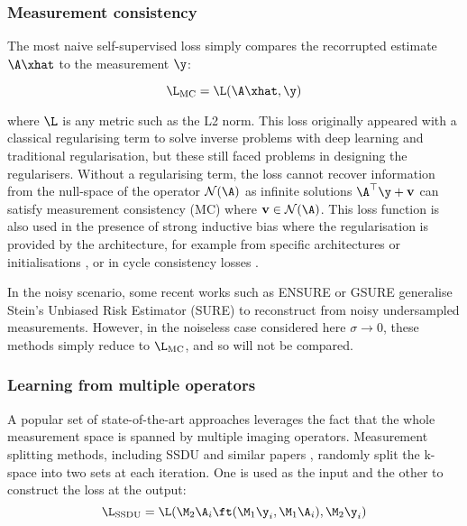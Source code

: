 \subsubsection{Measurement consistency}
The most naive self-supervised loss simply compares the recorrupted estimate $\A\xhat$ to the measurement $\y$:

\begin{equation}
    \L_\text{MC}=\L(\A\xhat,\y)
    \label{eq:mc}
\end{equation}

where $\L$ is any metric such as the L2 norm. This loss originally appeared with a classical regularising term to solve inverse problems with deep learning and traditional regularisation, but these still faced problems in designing the regularisers. Without a regularising term, the loss cannot recover information from the null-space of the operator $\mathcal{N}(\A)$ as infinite solutions $\A^\top\y+\mathbf{v}$ can satisfy measurement consistency (MC) where $\mathbf{v}\in\mathcal{N}(\A)$. This loss function is also used in the presence of strong inductive bias where the regularisation is provided by the architecture, for example from specific architectures \cite{darestani_accelerated_2021} or initialisations \cite{darestani_test-time_2022}, or in cycle consistency losses \cite{oh_unpaired_2020}.

In the noisy scenario, some recent works such as ENSURE \cite{aggarwal_ensure_2023} or GSURE \cite{metzler_unsupervised_2020} generalise Stein's Unbiased Risk Estimator (SURE) to reconstruct from noisy undersampled measurements. However, in the noiseless case considered here $\sigma\rightarrow0$, these methods simply reduce to $\L_\text{MC}$, and so will not be compared.

\subsubsection{Learning from multiple operators}
A popular set of state-of-the-art approaches leverages the fact that the whole measurement space is spanned by multiple imaging operators. Measurement splitting methods, including SSDU and similar papers \cite{yaman_self-supervised_2020,acar_self-supervised_2021,huang_self-supervised_2024,zhou_dual-domain_2022,hu_self-supervised_2021}, randomly split the k-space into two sets at each iteration. One is used as the input and the other to construct the loss at the output:
\begin{equation}
    \L_\text{SSDU}=\L(\M_2\A_i \ft(\M_1\y_i,\M_1\A_i),\M_2\y_i)
    \label{eq:splitting}
\end{equation}


